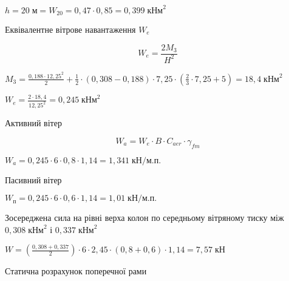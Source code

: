 \documentclass[a4paper,14pt]{article}
\begin{document}
$h=20\;\textit{м} = W_{20}= 0,47\cdot 0,85 = 0,399\;\textit{кНм}^2$

Еквівалентне вітрове навантаження $W_e$

\begin{equation}
    W_\textit{e}= \frac{2M_3}{H^2}
\end{equation}

$M_3 = \frac{0,188\cdot 12,25^2}{2}+\frac {1}{2}\cdot (0,308-0,188)\cdot 7,25 \cdot (\frac {2}{3}\cdot 7,25 + 5)= 18,4\;\textit{кНм}^2$ 

$W_\textit{e}= \frac{2\cdot 18,4}{12,25^2}= 0,245\;\textit{кНм}^2$ 

Активний вітер 

\begin{equation}
    W_\textit{a}= W_\textit{e} \cdot B\cdot C_{aer}\cdot \gamma_{fm} 
\end{equation}

$W_\textit{a}= 0,245 \cdot 6\cdot 0,8\cdot 1,14 = 1,341\;\textit{кН/м.п.}$   

Пасивний вітер

$W_\textit{п}= 0,245 \cdot 6\cdot 0,6\cdot 1,14 = 1,01\;\textit{кН/м.п.}$ 

Зосереджена сила на рівні верха колон по середньому вітряному тиску між $0,308\;\textit{кНм}^2$ і $0,337\;\textit{кНм}^2$

$W = (\frac{0,308+0,337}{2})\cdot 6 \cdot 2,45 \cdot (0,8+0,6)\cdot 1,14 = 7,57\;\textit{кН}$ 


Статична розрахунок поперечної рами 
\end{document}
